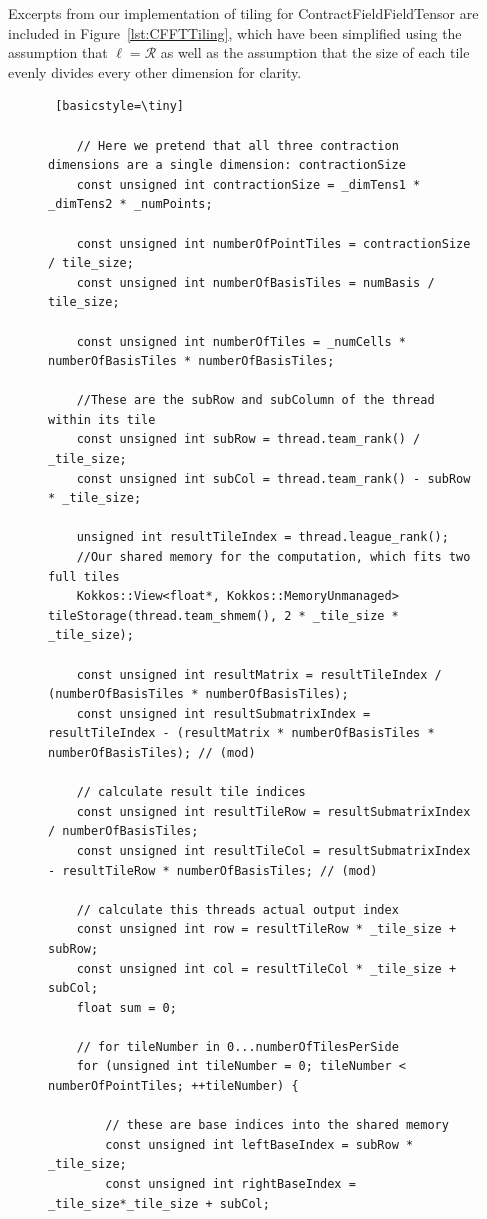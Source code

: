 Excerpts from our implementation of tiling for ContractFieldFieldTensor are included in Figure~\ref{lst:CFFTTiling}, which have been simplified using the assumption that $\ell=\mathcal{R}$ as well as the assumption that the size of each tile evenly divides every other dimension for clarity. 

\begin{figure}[H]
    \begin{lstlisting} [basicstyle=\tiny]

    // Here we pretend that all three contraction dimensions are a single dimension: contractionSize
    const unsigned int contractionSize = _dimTens1 * _dimTens2 * _numPoints;
    
    const unsigned int numberOfPointTiles = contractionSize / tile_size;
    const unsigned int numberOfBasisTiles = numBasis / tile_size;

    const unsigned int numberOfTiles = _numCells * numberOfBasisTiles * numberOfBasisTiles;
    
    //These are the subRow and subColumn of the thread within its tile
    const unsigned int subRow = thread.team_rank() / _tile_size;
    const unsigned int subCol = thread.team_rank() - subRow * _tile_size;

    unsigned int resultTileIndex = thread.league_rank();
    //Our shared memory for the computation, which fits two full tiles
    Kokkos::View<float*, Kokkos::MemoryUnmanaged> tileStorage(thread.team_shmem(), 2 * _tile_size * _tile_size);

    const unsigned int resultMatrix = resultTileIndex / (numberOfBasisTiles * numberOfBasisTiles);
    const unsigned int resultSubmatrixIndex = resultTileIndex - (resultMatrix * numberOfBasisTiles * numberOfBasisTiles); // (mod)

    // calculate result tile indices
    const unsigned int resultTileRow = resultSubmatrixIndex / numberOfBasisTiles;
    const unsigned int resultTileCol = resultSubmatrixIndex - resultTileRow * numberOfBasisTiles; // (mod)

    // calculate this threads actual output index
    const unsigned int row = resultTileRow * _tile_size + subRow;
    const unsigned int col = resultTileCol * _tile_size + subCol;
    float sum = 0;

    // for tileNumber in 0...numberOfTilesPerSide
    for (unsigned int tileNumber = 0; tileNumber < numberOfPointTiles; ++tileNumber) {

        // these are base indices into the shared memory
        const unsigned int leftBaseIndex = subRow * _tile_size;
        const unsigned int rightBaseIndex = _tile_size*_tile_size + subCol;


\end{lstlisting}
\end{figure}
